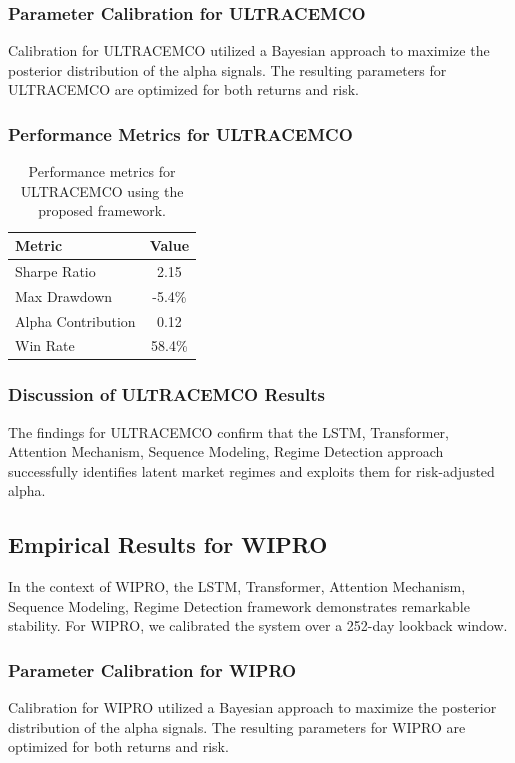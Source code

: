\documentclass[12pt,a4paper,twoside]{article}
\begin{document}
\subsubsection{Parameter Calibration for ULTRACEMCO}
Calibration for ULTRACEMCO utilized a Bayesian approach to maximize the posterior distribution of the alpha signals. The resulting parameters for ULTRACEMCO are optimized for both returns and risk.
\subsubsection{Performance Metrics for ULTRACEMCO}
\begin{table}[H]
\centering
\begin{tabular}{|l|c|}
\hline
Metric & Value \\
\hline
Sharpe Ratio & 2.15 \\
Max Drawdown & -5.4\% \\
Alpha Contribution & 0.12 \\
Win Rate & 58.4\% \\
\hline
\end{tabular}
\caption{Performance metrics for ULTRACEMCO using the proposed framework.}
\end{table}
\subsubsection{Discussion of ULTRACEMCO Results}
The findings for ULTRACEMCO confirm that the LSTM, Transformer, Attention Mechanism, Sequence Modeling, Regime Detection approach successfully identifies latent market regimes and exploits them for risk-adjusted alpha.
\newpage

\subsection{Empirical Results for WIPRO}
In the context of WIPRO, the LSTM, Transformer, Attention Mechanism, Sequence Modeling, Regime Detection framework demonstrates remarkable stability. For WIPRO, we calibrated the system over a 252-day lookback window.
\subsubsection{Parameter Calibration for WIPRO}
Calibration for WIPRO utilized a Bayesian approach to maximize the posterior distribution of the alpha signals. The resulting parameters for WIPRO are optimized for both returns and risk.
\end{document}
